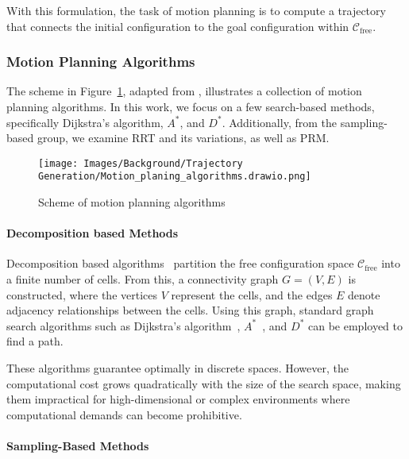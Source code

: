 With this formulation, the task of motion planning is to compute a trajectory that connects the initial configuration to the goal configuration within $\mathcal{C}_{\text{free}}$.

\subsubsection{Motion Planning Algorithms}

The scheme in Figure~\ref{fig:background:trajectory generation:motion planning algorithms}, adapted from \cite{InesBatista2022Thesis}, illustrates a collection of motion planning algorithms. In this work, we focus on a few search-based methods, specifically Dijkstra’s algorithm, $A^{*}$, and $D^{*}$. Additionally, from the sampling-based group, we examine RRT and its variations, as well as PRM.

\begin{figure}[H]
    \centering
    \texttt{[image: Images/Background/Trajectory Generation/Motion\_planing\_algorithms.drawio.png]}
    \caption{Scheme of motion planning algorithms~\cite{InesBatista2022Thesis}}
    \label{fig:background:trajectory generation:motion planning algorithms}
\end{figure}

\paragraph{Decomposition based Methods}

Decomposition based algorithms~\cite{latombe2012robot} partition the free configuration space $\mathcal{C}_{\text{free}}$ into a finite number of cells. From this, a connectivity graph $G = (V, E)$ is constructed, where the vertices $V$ represent the cells, and the edges $E$ denote adjacency relationships between the cells. Using this graph, standard graph search algorithms such as Dijkstra’s algorithm~\cite{dijkstra2022note}, $A^{*}$~\cite{A-start-original}, and $D^{*}$ can be employed to find a path.

These algorithms guarantee optimally in discrete spaces. However, the computational cost grows quadratically with the size of the search space, making them impractical for high-dimensional or complex environments where computational demands can become prohibitive.

\paragraph{Sampling-Based Methods}

